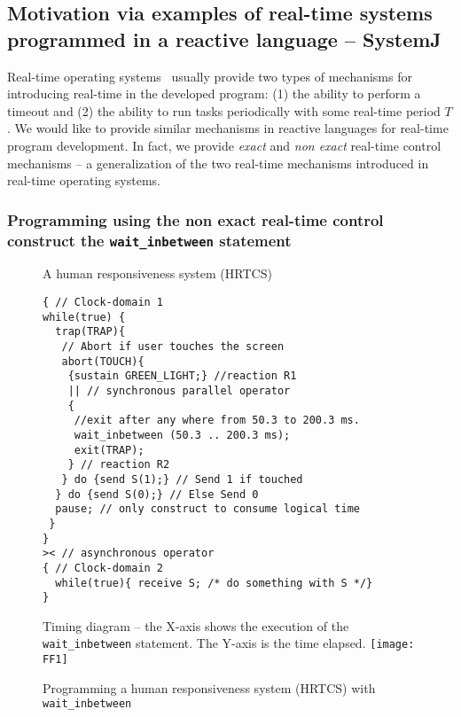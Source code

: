 \subsection{Motivation via examples of real-time systems programmed in a
reactive language -- SystemJ}
\label{sec:motivating-example}


Real-time operating systems~\cite{barry2009using} usually provide two
types of mechanisms for introducing real-time in the developed program:
(1) the ability to perform a timeout and (2) the ability to run tasks
periodically with some real-time period $T$. We would like to provide
similar mechanisms in reactive languages for real-time program
development. In fact, we provide \textit{exact} and \textit{non exact}
real-time control mechanisms -- a generalization of the two real-time
mechanisms introduced in real-time operating systems.

\subsubsection{Programming using the non exact real-time control
  construct the \textrm{\texttt{wait\_inbetween}} statement}
\label{sec:progr-using-non}

\begin{figure}[t!]
	\vspace{-10pt}
        \begin{SubFloat}{\label{delaycode:a}A human responsiveness
            system (HRTCS)}
        \begin{lstlisting}[style=sysj,morekeywords={sustain,send,receive,abort,await,emit,present,trap,pause,exit,wait_inbetween,suspend}]
{ // Clock-domain 1
while(true) {
  trap(TRAP){
   // Abort if user touches the screen
   abort(TOUCH){
    {sustain GREEN_LIGHT;} //reaction R1
    || // synchronous parallel operator
    {
     //exit after any where from 50.3 to 200.3 ms.
     wait_inbetween (50.3 .. 200.3 ms); 
     exit(TRAP); 
    } // reaction R2
   } do {send S(1);} // Send 1 if touched 
  } do {send S(0);} // Else Send 0
  pause; // only construct to consume logical time
 }
}
>< // asynchronous operator
{ // Clock-domain 2
  while(true){ receive S; /* do something with S */}
}
\end{lstlisting}
\end{SubFloat}
\begin{SubFloat}{\label{delaycode:b}Timing diagram -- the X-axis shows
    the execution of the \texttt{wait\_inbetween} statement. The Y-axis
    is the time elapsed.}
    \centering
    \texttt{[image: FF1]}
\end{SubFloat}
\caption{Programming a human responsiveness system (HRTCS) with
  \texttt{wait\_inbetween}}
\label{fig:1}
\end{figure}


